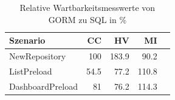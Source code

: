 \begin{table}[ht]
\centering
\caption{Relative Wartbarkeitsmesswerte von GORM zu SQL in \%}
\begin{tabular}{lrrrr}
\toprule
Szenario & CC & HV & MI \\
\midrule
	NewRepository &  100 & \cellcolor{red!30}  183.9 & \cellcolor{red!14}  90.2 \\
	ListPreload & \cellcolor{green!28}  54.5 & \cellcolor{green!19}  77.2 & \cellcolor{green!14}  110.8 \\
	DashboardPreload & \cellcolor{green!18}  81 & \cellcolor{green!20}  76.2 & \cellcolor{green!16}  114.3 \\
\bottomrule
\end{tabular}
\label{tab:wartbarkeit_relativ_gorm}
\end{table}
	